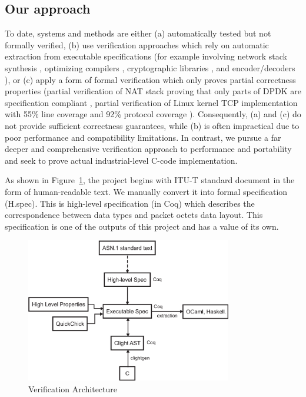 \documentclass[10p,conference]{IEEEtran}
\begin{document}
\subsection{Our approach}
\label{sec:approach}
To date, systems and methods are either (a) automatically tested but not
formally verified, (b) use verification approaches which rely on
automatic extraction from executable specifications (for example
involving network stack synthesis \cite{VNSSforSel4}, optimizing compilers
\cite{CompCert}, cryptographic libraries \cite{HACL}, and
encoder/decoders \cite{Narcissus}), or (c) apply a form of formal
verification which only proves partial correctness properties (partial
verification of NAT stack proving that only parts of DPDK are specification
compliant \cite{NAT}, partial verification of Linux kernel TCP
implementation with 55\% line coverage and 92\% protocol coverage
\cite{NSDI}). Consequently, (a) and (c) do not provide sufficient
correctness guarantees, while (b) is often impractical due to poor
performance and compatibility limitations. In contrast, we pursue a
far deeper and comprehensive verification approach to performance and
portability and seek to prove actual industrial-level C-code
implementation.

As shown in Figure~\ref{fig:components}, the project begins with ITU-T
standard document in the form of human-readable text. We manually
convert it into formal specification (H.spec). This is high-level
specification (in Coq) which describes the correspondence between data
types and packet octets data layout. This
specification is one of the outputs of this project and has a value of
its own.

\begin{figure}[h!]
  \centering
  \includegraphics[width=9cm]{VerificationArchitectureDiagram.eps}
  \caption{Verification Architecture}
  \label{fig:components}
\end{figure}
\end{document}
